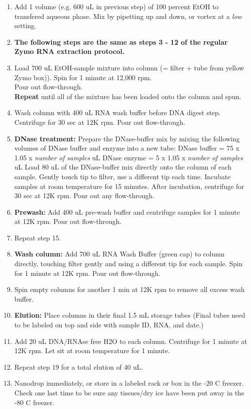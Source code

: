 \documentclass[a4paper,12pt,twoside]{book}
\begin{document}
\begin{enumerate}
	\item Add 1 volume (e.g. 600  uL in previous step) of 100 percent EtOH to transfered aqueous phase. Mix by pipetting up and down, or vortex at a {\em low} setting. 
	\item[] {\bf The following steps are the same as steps 3 - 12 of the regular Zymo RNA extraction protocol.}
	\item Load 700 uL EtOH-sample mixture into column (= filter + tube from yellow Zymo box)). Spin for 1 minute at 12,000 rpm.  \\
	Pour out flow-through. \\
	{\bf Repeat} until all of the mixture has been loaded onto the column and spun. 
	\item Wash column with 400 uL RNA wash buffer before DNA digest step. Centrifuge for 30 sec at 12K rpm. Pour out flow-through.
	\item {\bf DNase treatment:} 
	\subitem Prepare the DNase-buffer mix by mixing the following volumes of DNase buffer and enzyme into a new tube: 
	\subitem DNase buffer = 75 x 1.05 x {\em number of samples}  uL 
	\subitem DNase enzyme =  5 x 1.05 x {\em number of samples} uL 
	\subitem Load 80 uL of the DNase-buffer mix directly onto the column of each sample. Gently touch tip to filter, use a different tip each time. 
	\subitem Incubate samples at room temperature for 15 minutes.  
	\subitem After incubation, centrifuge for 30 sec at 12K rpm. Pour out any flow-through. 
	\item {\bf Prewash:} Add 400 uL pre-wash buffer and centrifuge samples for 1 minute at 12K rpm. Pour out flow-through.
	\item Repeat step 15. 
	\item {\bf Wash column:} Add  700 uL RNA Wash Buffer (green cap) to column directly, touching filter gently and using a different tip for each sample.  Spin for 1 minute at 12K rpm.  Pour out flow-through. 
	\item Spin empty columns for another 1 min at 12K rpm to remove all excess wash buffer. 
	\item{\bf Elution:} Place columns in their final 1.5 mL storage tubes 
	(Final tubes need to be labeled on top and side with sample ID, RNA, and date.) 
	\item[] Add 20 uL DNA/RNAse free H2O to each column.  Centrifuge for 1 minute at 12K rpm.  Let sit at room temperature for 1 minute. 
	\item Repeat step 19 for a total elution of 40 uL. 
	\item Nanodrop immediately, or store in a labeled rack or box in the -20 C freezer. 
	\subitem Check one last time to be sure any tissues/dry ice have been put away in the -80 C freezer. 
	

\end{enumerate}
\end{document}
